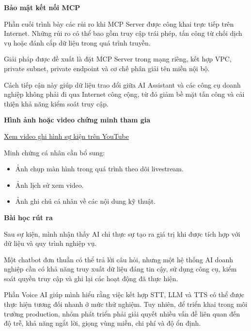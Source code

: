\vspace{0.5em}\noindent\textbf{Bảo mật kết nối
MCP}\par

Phần cuối trình bày các rủi ro khi MCP Server được công khai trực tiếp
trên Internet. Những rủi ro có thể bao gồm truy cập trái phép, tấn công
từ chối dịch vụ hoặc đánh cắp dữ liệu trong quá trình truyền.

Giải pháp được đề xuất là đặt MCP Server trong mạng riêng, kết hợp VPC,
private subnet, private endpoint và cơ chế phân giải tên miền nội bộ.

Cách tiếp cận này giúp dữ liệu trao đổi giữa AI Assistant và các công cụ
doanh nghiệp không phải đi qua Internet công cộng, từ đó giảm bề mặt tấn
công và cải thiện khả năng kiểm soát truy cập.

\vspace{0.5em}\noindent\textbf{Hình ảnh hoặc video chứng minh tham
gia}\par

\href{https://www.youtube.com/live/G8-WlI7f6dE?si=4tnIqB3yrCUW6yjv}{Xem
video ghi hình sự kiện trên YouTube}

Minh chứng cá nhân cần bổ sung:

\begin{itemize}
\tightlist
\item
  Ảnh chụp màn hình trong quá trình theo dõi livestream.
\item
  Ảnh lịch sử xem video.
\item
  Ảnh ghi chú cá nhân về các nội dung kỹ thuật.
\end{itemize}

\vspace{0.5em}\noindent\textbf{Bài học rút ra}\par

Sau sự kiện, mình nhận thấy AI chỉ thực sự tạo ra giá trị khi được tích
hợp với dữ liệu và quy trình nghiệp vụ.

Một chatbot đơn thuần có thể trả lời câu hỏi, nhưng một hệ thống AI
doanh nghiệp cần có khả năng truy xuất dữ liệu đáng tin cậy, sử dụng
công cụ, kiểm soát quyền truy cập và ghi lại các hoạt động đã thực hiện.

Phần Voice AI giúp mình hiểu rằng việc kết hợp STT, LLM và TTS có thể
được thực hiện tương đối nhanh ở mức thử nghiệm. Tuy nhiên, để triển
khai trong môi trường production, nhóm phát triển phải giải quyết nhiều
vấn đề liên quan đến độ trễ, khả năng ngắt lời, giọng vùng miền, chi phí
và độ ổn định.


